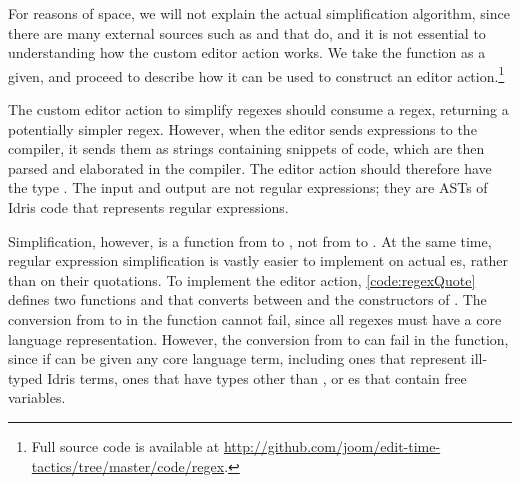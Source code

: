 For reasons of space, we will not explain the actual simplification algorithm, since there are
many external sources such as \citet{ortizRegex} and \citet{harperRegex}
 that do, and it is not essential to understanding how the custom
editor action works.
We take the function  as a
given, and proceed to describe how it can be used to construct an editor
action.\footnote{Full source code is available at
\url{http://github.com/joom/edit-time-tactics/tree/master/code/regex}.}

The custom editor action to simplify regexes should consume a regex, returning a
potentially simpler regex. However, when the editor sends expressions to the compiler,
it sends them as strings containing snippets of code, which are then parsed and
elaborated in the compiler.  The editor action should therefore have the type
\mt{\TT{} -> \Elab{} \TT{}}. The input and output are not regular expressions;
they are ASTs of Idris code that represents regular expressions.

Simplification, however, is a function from  to , not from
 to .
At the same time, regular expression simplification is vastly easier to implement
on actual es, rather than on their quotations.
To implement the editor action, \autoref{code:regexQuote} defines two functions  and 
that converts between \TT{} and the constructors of . The
conversion from  to  in the  function cannot fail,
since all regexes must have a core language representation. However, the
conversion from \TT{} to  can fail in the  function,
since if  can be given any core language term, including ones that
represent ill-typed Idris terms, ones that have types other than , or es
that contain free variables.

